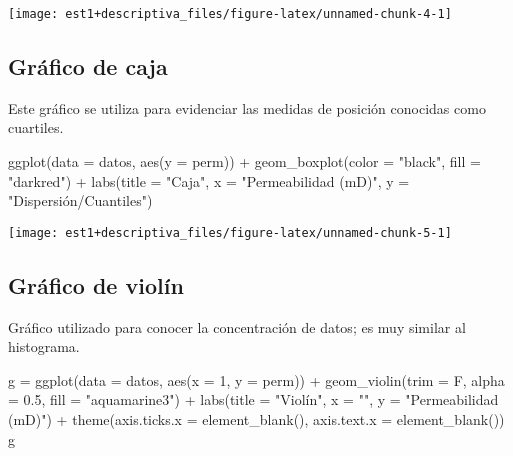 \documentclass[
]{book}
\newenvironment{Shaded}{\begin{snugshade}}{\end{snugshade}}
\newcommand{\AttributeTok}[1]{\textcolor[rgb]{0.77,0.63,0.00}{#1}}
\newcommand{\DecValTok}[1]{\textcolor[rgb]{0.00,0.00,0.81}{#1}}
\newcommand{\FloatTok}[1]{\textcolor[rgb]{0.00,0.00,0.81}{#1}}
\newcommand{\FunctionTok}[1]{\textcolor[rgb]{0.00,0.00,0.00}{#1}}
\newcommand{\NormalTok}[1]{#1}
\newcommand{\OtherTok}[1]{\textcolor[rgb]{0.56,0.35,0.01}{#1}}
\newcommand{\SpecialCharTok}[1]{\textcolor[rgb]{0.00,0.00,0.00}{#1}}
\newcommand{\StringTok}[1]{\textcolor[rgb]{0.31,0.60,0.02}{#1}}
\theoremstyle{definition}
\theoremstyle{definition}
\theoremstyle{definition}
\theoremstyle{definition}
\theoremstyle{remark}
\begin{document}
\begin{center}\texttt{[image: est1+descriptiva\_files/figure-latex/unnamed-chunk-4-1]} \end{center}

\hypertarget{gruxe1fico-de-caja}{%
\subsection*{Gráfico de caja}\label{gruxe1fico-de-caja}}

Este gráfico se utiliza para evidenciar las medidas de posición conocidas como cuartiles.

\begin{Shaded}
\begin{Highlighting}[]
\FunctionTok{ggplot}\NormalTok{(}\AttributeTok{data =}\NormalTok{ datos, }\FunctionTok{aes}\NormalTok{(}\AttributeTok{y =}\NormalTok{ perm)) }\SpecialCharTok{+} 
  \FunctionTok{geom\_boxplot}\NormalTok{(}\AttributeTok{color =} \StringTok{"black"}\NormalTok{, }\AttributeTok{fill =} \StringTok{"darkred"}\NormalTok{) }\SpecialCharTok{+}
  \FunctionTok{labs}\NormalTok{(}\AttributeTok{title =} \StringTok{"Caja"}\NormalTok{, }\AttributeTok{x =} \StringTok{"Permeabilidad (mD)"}\NormalTok{, }\AttributeTok{y =} \StringTok{"Dispersión/Cuantiles"}\NormalTok{) }
\end{Highlighting}
\end{Shaded}

\begin{center}\texttt{[image: est1+descriptiva\_files/figure-latex/unnamed-chunk-5-1]} \end{center}

\hypertarget{gruxe1fico-de-violuxedn}{%
\subsection*{Gráfico de violín}\label{gruxe1fico-de-violuxedn}}

Gráfico utilizado para conocer la concentración de datos; es muy similar al histograma.

\begin{Shaded}
\begin{Highlighting}[]
\NormalTok{g }\OtherTok{=} \FunctionTok{ggplot}\NormalTok{(}\AttributeTok{data =}\NormalTok{ datos, }\FunctionTok{aes}\NormalTok{(}\AttributeTok{x =} \DecValTok{1}\NormalTok{, }\AttributeTok{y =}\NormalTok{ perm)) }\SpecialCharTok{+} 
  \FunctionTok{geom\_violin}\NormalTok{(}\AttributeTok{trim =}\NormalTok{ F, }\AttributeTok{alpha =} \FloatTok{0.5}\NormalTok{, }\AttributeTok{fill =} \StringTok{"aquamarine3"}\NormalTok{) }\SpecialCharTok{+}
  \FunctionTok{labs}\NormalTok{(}\AttributeTok{title =} \StringTok{"Violín"}\NormalTok{, }\AttributeTok{x =} \StringTok{""}\NormalTok{, }\AttributeTok{y =} \StringTok{"Permeabilidad (mD)"}\NormalTok{) }\SpecialCharTok{+} 
  \FunctionTok{theme}\NormalTok{(}\AttributeTok{axis.ticks.x =} \FunctionTok{element\_blank}\NormalTok{(),}
        \AttributeTok{axis.text.x =} \FunctionTok{element\_blank}\NormalTok{())}
\NormalTok{g}
\end{Highlighting}
\end{Shaded}
\end{document}
